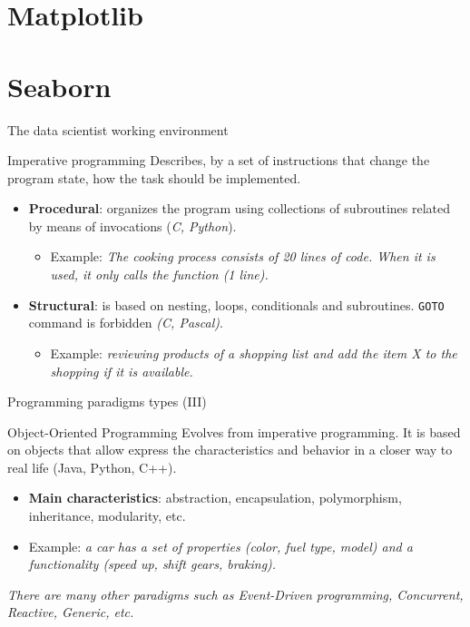 \documentclass[10pt,compress]{beamer} %
\begin{document}
\section{Matplotlib}
\section{Seaborn}

\begin{frame}{The data scientist working environment}
	\begin{block}{Imperative programming}
		Describes, by a set of instructions that change the \alert{program state}, \alert{how} the task should be implemented.  
  	\end{block}
  	\begin{itemize}
  		\item \textbf{Procedural}: organizes the program using collections of subroutines related by means of invocations (\textit{C, Python}).
  		\begin{itemize}
  			\item Example: \textit{The cooking process consists of 20 lines of code. When it is used, it only calls the function (1 line).} 
  		\end{itemize}
  		\item \textbf{Structural}: is based on nesting, loops, conditionals and subroutines. \texttt{GOTO} command is forbidden 				 \textit{(C, Pascal)}.
  		\begin{itemize}
  			\item Example: \textit{reviewing products of a shopping list and add the item X to the shopping if it is available.} 
  		\end{itemize}
  	\end{itemize}
\end{frame}

\begin{frame}{Programming paradigms types (III)}{}
	\begin{block}{Object-Oriented Programming}
		Evolves from imperative programming. It is based on \alert{objects} that allow express the \alert{characteristics} and \alert{behavior} in a closer way to real life (Java, Python, C++). 
  	\end{block}
  	\begin{itemize}
  		\item \textbf{Main characteristics}: abstraction, encapsulation, polymorphism, inheritance, modularity, etc.
		\item Example: \textit{a car has a set of properties (color, fuel type, model) and a functionality (speed up, shift gears, braking).} 
  	\end{itemize}
  	
\textit{\alert{There are many other paradigms such as Event-Driven programming, Concurrent, Reactive, Generic, etc.}}
\end{frame}
\end{document}
